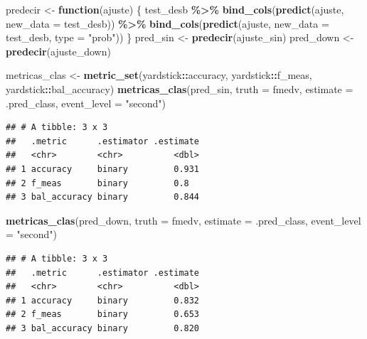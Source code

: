 \documentclass[
]{book}
\newenvironment{Shaded}{\begin{snugshade}}{\end{snugshade}}
\newcommand{\AttributeTok}[1]{\textcolor[rgb]{0.13,0.29,0.53}{#1}}
\newcommand{\ControlFlowTok}[1]{\textcolor[rgb]{0.13,0.29,0.53}{\textbf{#1}}}
\newcommand{\FunctionTok}[1]{\textcolor[rgb]{0.13,0.29,0.53}{\textbf{#1}}}
\newcommand{\NormalTok}[1]{#1}
\newcommand{\OtherTok}[1]{\textcolor[rgb]{0.56,0.35,0.01}{#1}}
\newcommand{\SpecialCharTok}[1]{\textcolor[rgb]{0.81,0.36,0.00}{\textbf{#1}}}
\newcommand{\StringTok}[1]{\textcolor[rgb]{0.31,0.60,0.02}{#1}}
\theoremstyle{break}
\theoremstyle{nonumberplain}
\begin{document}
\begin{Shaded}
\begin{Highlighting}[]
\NormalTok{predecir }\OtherTok{\textless{}{-}} \ControlFlowTok{function}\NormalTok{(ajuste) \{}
\NormalTok{  test\_desb }\SpecialCharTok{\%\textgreater{}\%}
    \FunctionTok{bind\_cols}\NormalTok{(}\FunctionTok{predict}\NormalTok{(ajuste, }\AttributeTok{new\_data =}\NormalTok{ test\_desb)) }\SpecialCharTok{\%\textgreater{}\%}
    \FunctionTok{bind\_cols}\NormalTok{(}\FunctionTok{predict}\NormalTok{(ajuste, }\AttributeTok{new\_data =}\NormalTok{ test\_desb, }\AttributeTok{type =} \StringTok{"prob"}\NormalTok{))}
\NormalTok{\}}
\NormalTok{pred\_sin }\OtherTok{\textless{}{-}} \FunctionTok{predecir}\NormalTok{(ajuste\_sin)}
\NormalTok{pred\_down }\OtherTok{\textless{}{-}} \FunctionTok{predecir}\NormalTok{(ajuste\_down)}

\NormalTok{metricas\_clas }\OtherTok{\textless{}{-}} \FunctionTok{metric\_set}\NormalTok{(yardstick}\SpecialCharTok{::}\NormalTok{accuracy, yardstick}\SpecialCharTok{::}\NormalTok{f\_meas,}
\NormalTok{                             yardstick}\SpecialCharTok{::}\NormalTok{bal\_accuracy)}
\FunctionTok{metricas\_clas}\NormalTok{(pred\_sin, }\AttributeTok{truth =}\NormalTok{ fmedv, }\AttributeTok{estimate =}\NormalTok{ .pred\_class,}
              \AttributeTok{event\_level =} \StringTok{"second"}\NormalTok{)}
\end{Highlighting}
\end{Shaded}

\begin{verbatim}
## # A tibble: 3 x 3
##   .metric      .estimator .estimate
##   <chr>        <chr>          <dbl>
## 1 accuracy     binary         0.931
## 2 f_meas       binary         0.8  
## 3 bal_accuracy binary         0.844
\end{verbatim}

\begin{Shaded}
\begin{Highlighting}[]
\FunctionTok{metricas\_clas}\NormalTok{(pred\_down, }\AttributeTok{truth =}\NormalTok{ fmedv, }\AttributeTok{estimate =}\NormalTok{ .pred\_class,}
              \AttributeTok{event\_level =} \StringTok{"second"}\NormalTok{)}
\end{Highlighting}
\end{Shaded}

\begin{verbatim}
## # A tibble: 3 x 3
##   .metric      .estimator .estimate
##   <chr>        <chr>          <dbl>
## 1 accuracy     binary         0.832
## 2 f_meas       binary         0.653
## 3 bal_accuracy binary         0.820
\end{verbatim}
\end{document}
